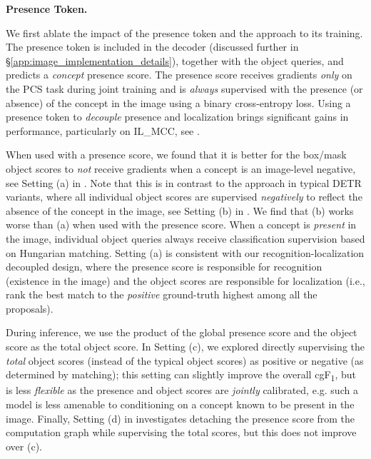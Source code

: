 \documentclass[]{fairmeta}
\newcommand{\task}{PCS\xspace}
\newcommand{\cgf}{cgF\textsubscript{1}\xspace}
\newcommand{\ilmcc}{IL\_MCC\xspace}
\renewcommand{\paragraph}[1]{%
	\noindent\textbf{#1.}\noindent\xspace%
}
\begin{document}
\paragraph{Presence Token}
We first ablate the impact of the presence token and the approach to its training. The presence token is included in the decoder (discussed further in \S\ref{app:image_implementation_details}), together with the object queries, and predicts a \textit{concept} presence score. The presence score receives gradients \textit{only} on the \task task during joint training and is \textit{always} supervised with the presence (or absence) of the concept in the image using a binary cross-entropy loss. Using a presence token to \textit{decouple} presence and localization brings significant gains in performance, particularly on \ilmcc, see .


When used with a presence score, we found that it is better for the box/mask object scores to \textit{not} receive gradients when a concept is an image-level negative, see Setting (a) in . Note that this is in contrast to the approach in typical DETR variants, where all individual object scores are supervised \textit{negatively} to reflect the absence of the concept in the image, see Setting (b) in . We find that (b) works worse than (a) when used with the presence score. When a concept is \textit{present} in the image, individual object queries always receive classification supervision based on Hungarian matching. Setting (a) is consistent with our recognition-localization decoupled design, where the presence score is responsible for recognition (existence in the image) and the object scores are responsible for localization (i.e., rank the best match to the \textit{positive} ground-truth highest among all the proposals). 

During inference, we use the product of the global presence score and the object score as the total object score. In Setting (c), we explored directly supervising the \textit{total} object scores (instead of the typical object scores) as positive or negative (as determined by matching); this setting can slightly improve the overall \cgf, but is less \textit{flexible} as the presence and object scores are \textit{jointly} calibrated, e.g. such a model is less amenable to conditioning on a concept known to be present in the image. Finally, Setting (d) in  investigates detaching the presence score from the computation graph while supervising the total scores, but this does not improve over (c).
\end{document}
